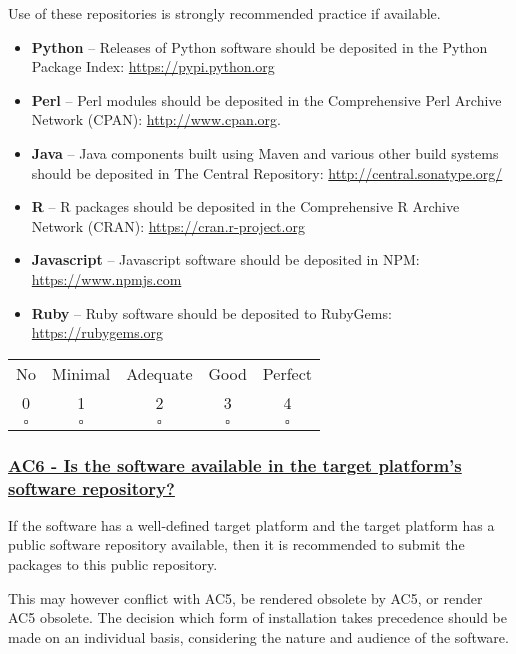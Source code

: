 \documentclass[a4paper,11pt]{article}
\newcommand{\criterion}[2]{\subsubsection*{\underline{#1 - #2}}\label{id:#1}}
\newcommand\CheckTable{%
  \begin{tabular}{ccccc}
    No & Minimal & Adequate & Good & Perfect \\
    0 & 1 & 2 & 3 & 4 \\
    \hline
    $\square$ & $\square$ & $\square$ & $\square$ & $\square$ \\
  \end{tabular}%
}
\begin{document}
Use of these repositories is strongly recommended practice if available.

\begin{itemize}
    \item \textbf{Python} -- Releases of Python software should be deposited in
        the Python Package Index: \url{https://pypi.python.org}
    \item \textbf{Perl} --  Perl modules should be deposited in the Comprehensive
        Perl Archive Network (CPAN): \url{http://www.cpan.org}.
    \item \textbf{Java} -- Java components built using Maven and various other
        build systems should be deposited in The Central Repository: \url{http://central.sonatype.org/}
    \item \textbf{R} -- R packages should be deposited in the Comprehensive R
        Archive Network (CRAN): \url{https://cran.r-project.org}
    \item \textbf{Javascript} -- Javascript software should be deposited in
        NPM: \url{https://www.npmjs.com}
    \item \textbf{Ruby} -- Ruby software should be deposited to 
        RubyGems: \url{https://rubygems.org}
\end{itemize}

\CheckTable

\newcommand{\acSixID}{AC6}
\newcommand{\acSixText}{Is the software available in the target platform's software repository?}
\criterion{\acSixID}{\acSixText}

If the software has a well-defined target platform and the target platform has
a public software repository available, then it is recommended to submit the
packages to this public repository.

This may however conflict with AC5, be rendered obsolete by AC5, or render AC5
obsolete. The decision which form of installation takes precedence should be
made on an individual basis, considering the nature and audience of the
software.
\end{document}

